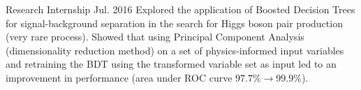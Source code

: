 \begin{cventries}
    {Research Internship}
    {}
    {Jul. 2016}
    {Explored the application of Boosted Decision Trees for signal-background separation in the search for Higgs boson pair production (very rare process). Showed that using Principal Component Analysis (dimensionality reduction method) on a set of physics-informed input variables and retraining the BDT using the transformed variable set as input led to an improvement in performance (area under ROC curve $97.7\% \to 99.9\%$).}

\end{cventries}